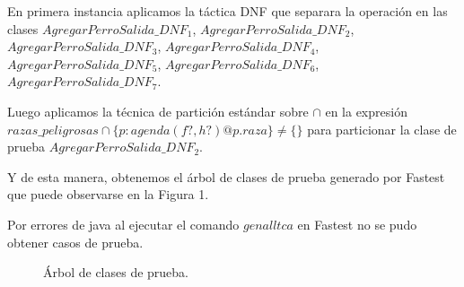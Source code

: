 \documentclass[12pt,zed]{article}
\begin{document}
En primera instancia aplicamos la táctica DNF que separara la operación en las clases $AgregarPerroSalida\_DNF_1$, $AgregarPerroSalida\_DNF_2$, $AgregarPerroSalida\_DNF_3$, $AgregarPerroSalida\_DNF_4$, $AgregarPerroSalida\_DNF_5$, $AgregarPerroSalida\_DNF_6$, $AgregarPerroSalida\_DNF_7$.

Luego aplicamos la técnica de partición estándar sobre $\cap$ en la expresión $razas\_ peligrosas \cap \{ p : agenda ( f? , h? ) @ p . raza \} \neq \{ \}$ para particionar la clase de prueba $AgregarPerroSalida\_DNF_2$.

Y de esta manera, obtenemos el árbol de clases de prueba generado por Fastest que puede observarse en la Figura 1.

Por errores de java al ejecutar el comando $genalltca$ en Fastest no se pudo obtener casos de prueba.

\begin{figure}[h]
\centering
\begin{minipage}{7cm}
\end{minipage}
\caption{Árbol de clases de prueba.}
\end{figure}
\end{document}
